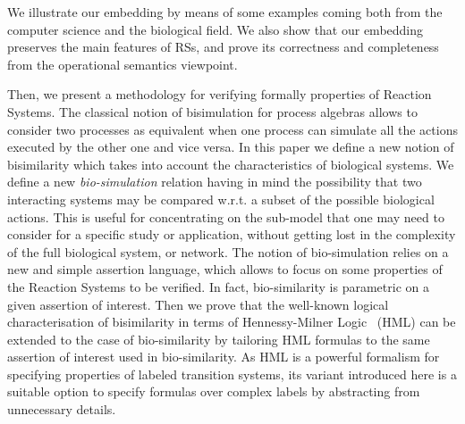 We illustrate our embedding by means of some examples coming
both from the computer science and the biological field.
We also show that our embedding preserves the main
features of RSs, and prove its correctness and completeness
from the operational semantics viewpoint.

Then, we present a methodology for verifying formally
properties of Reaction Systems. The classical notion of bisimulation for 
process algebras allows to consider two processes as equivalent 
when one process can simulate all the actions executed 
by the other one and vice versa. In this paper we define a new
notion of bisimilarity which takes into account the characteristics
of biological systems. We define a new {\em bio-simulation} relation having in mind
the possibility that two interacting systems may be compared w.r.t.
a subset of the possible biological actions. This is useful for concentrating 
on the sub-model that one may need to consider for a specific study or application,
without getting lost in the complexity of the full biological system, or network.
The notion of bio-simulation relies on a new and simple assertion language,
which allows to focus on some properties of the Reaction Systems to be verified.
In fact, bio-similarity is parametric on a given assertion of interest.
Then we prove that the well-known logical characterisation of bisimilarity in terms of Hennessy-Milner Logic~\cite{HM80} (HML)
can be extended to the case of bio-similarity by tailoring HML formulas to
the same assertion of interest used in bio-similarity.  As HML is a powerful
formalism for specifying properties of labeled transition systems, 
its variant introduced here is a suitable option to specify formulas 
over complex labels by abstracting from unnecessary details.


